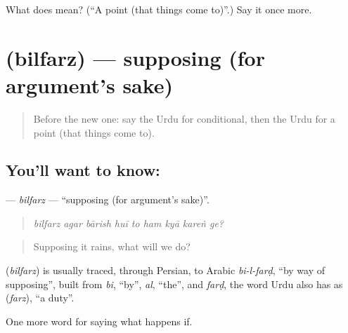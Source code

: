 \begin{tcolorbox}[breakable,colback=teal!4,colframe=teal!35!black,title={Before you move on}]
What does  mean? (\textquotedblleft{}A point (that things come to)\textquotedblright{}.) Say it once more.
\end{tcolorbox}
\section[\texorpdfstring{\ur{بالفرض} (bilfarz)}{بالفرض (bilfarz)}]{ (bilfarz) — supposing (for argument's sake)}

\label{lesson:UR-C541-bilfarz}



\begin{quote}
Before the new one: say the Urdu for conditional, then the Urdu for a point (that things come to).
\end{quote}

\subsection*{You'll want to know: }
\textbf{} — \emph{bilfarz} — \textquotedblleft{}supposing (for argument's sake)\textquotedblright{}.

\begin{quote}
        
\end{quote}

\begin{quote}
\emph{bilfarz agar bārish huī to ham kyā kareṅ ge?}
\end{quote}

\begin{quote}
Supposing it rains, what will we do?
\end{quote}

\begin{cousinweb}
\textbf{} (\emph{bilfarz}) is usually traced, through Persian, to Arabic \emph{bi-l-farḍ}, \textquotedblleft{}by way of supposing\textquotedblright{}, built from \emph{bi}, \textquotedblleft{}by\textquotedblright{}, \emph{al}, \textquotedblleft{}the\textquotedblright{}, and \emph{farḍ}, the word Urdu also has as \textbf{} (\emph{farz}), \textquotedblleft{}a duty\textquotedblright{}.
\end{cousinweb}

\begin{grammarlens}[title={What you've built}]
One more word for saying what happens if.
\end{grammarlens}

